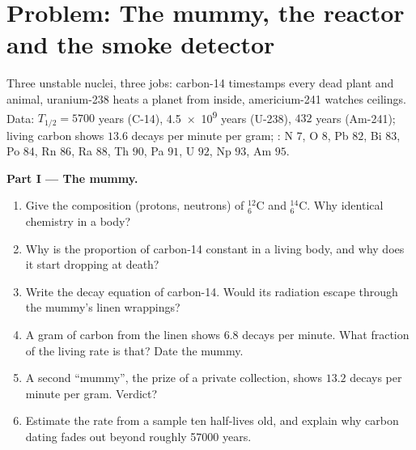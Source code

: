 \section{Problem: The mummy, the reactor and the smoke detector}

\begin{problem}
\label{pb:g11:nucleus-radioactivity:1}
Three unstable nuclei, three jobs: carbon-14 timestamps every dead plant
and animal, uranium-238 heats a planet from inside, americium-241 watches
ceilings. Data: $T_{1/2} = \num{5700}$ years (C-14), \num{4.5e9} years
(U-238), $432$ years (Am-241); living carbon shows $13.6$ decays per minute
per gram; : N $7$, O $8$, Pb $82$, Bi $83$, Po $84$, Rn $86$,
Ra $88$, Th $90$, Pa $91$, U $92$, Np $93$, Am $95$.

\medskip
\noindent\textbf{Part I --- The mummy.}
\begin{enumerate}
  \item Give the composition (protons, neutrons) of ${}^{12}_{6}\mathrm{C}$
        and ${}^{14}_{6}\mathrm{C}$. Why identical chemistry in a body?
  \item Why is the proportion of carbon-14 constant in a living body, and
        why does it start dropping at death?
  \item Write the decay equation of carbon-14. Would its radiation escape
        through the mummy's linen wrappings?
  \item A gram of carbon from the linen shows $6.8$ decays per minute.
        What fraction of the living rate is that? Date the mummy.
  \item A second ``mummy'', the prize of a private collection, shows
        $13.2$ decays per minute per gram. Verdict?
  \item Estimate the rate from a sample ten half-lives old, and explain
        why carbon dating fades out beyond roughly \num{57000} years.
\end{enumerate}


\end{problem}
